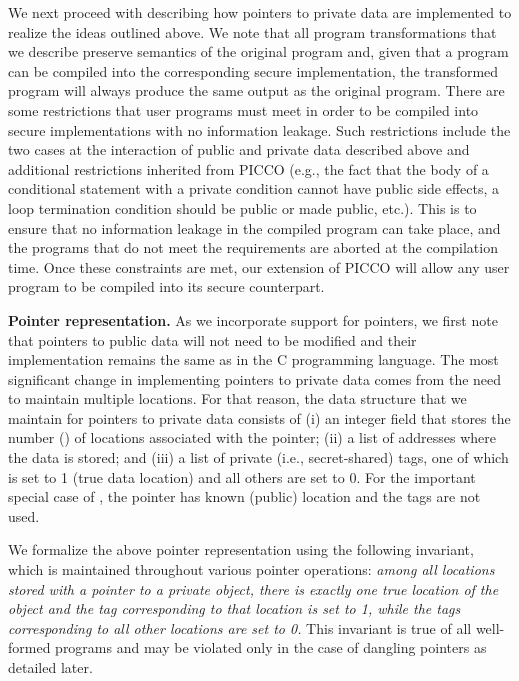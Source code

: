 \documentclass[11pt]{article}
\begin{document}
We next proceed with describing how pointers to private data are
implemented to realize the ideas outlined above. We note that all
program transformations that we describe preserve semantics of the
original program and, given that a program can be compiled into the
corresponding secure implementation, the transformed program will
always produce the same output as the original program. There are some
restrictions that user programs must meet in order to be compiled into
secure implementations with no information leakage. Such restrictions
include the two cases at the interaction of public and private data
described above and additional restrictions inherited from PICCO
(e.g., the fact that the body of a conditional statement with a
private condition cannot have public side effects, a loop termination
condition should be public or made public, etc.). This is to ensure
that no information leakage in the compiled program can take place,
and the programs that do not meet the requirements are aborted at the
compilation time. Once these constraints are met, our extension of
PICCO will allow any user program to be compiled into its secure
counterpart.

\medskip \noindent \textbf{Pointer representation.}
As we incorporate support for pointers, we first note that pointers to
public data will not need to be modified and their implementation remains
the same as in the C programming language. The most significant change in
implementing pointers to private data comes from the need to maintain
multiple locations. For that reason, the data structure that we maintain
for pointers to private data consists of (i) an integer field that stores
the number  () of locations associated with the pointer; (ii)
a list of  addresses where the data is stored; and (iii) a list of
 private (i.e., secret-shared) tags, one of which is set to 1 (true
data location) and all others are set to 0. For the important special case of
, the pointer has known (public) location and the tags are not
used. 

We formalize the above pointer representation using the following invariant,
which is maintained throughout various pointer operations: \emph{among all
locations stored with a pointer to a private object, there is exactly one
true location of the object and the tag corresponding to that location is
set to 1, while the tags corresponding to all other locations are set to 0.}
This invariant is true of all well-formed programs and may be violated only
in the case of dangling pointers as detailed later.
\end{document}
